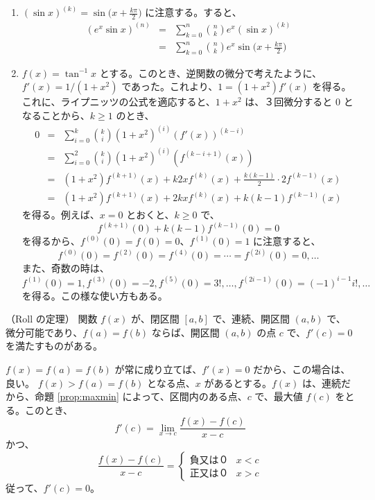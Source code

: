 \begin{eg}
\begin{enumerate}
\item ${\displaystyle (\sin x)^{(k)} = \sin\bigl(x+\frac{k\pi}{2}\bigr)}$ に注意する。すると、
\begin{eqnarray*}
(e^x\sin x)^{(n)} & =  & \sum_{k=0}^n {n\choose k}e^x(\sin x)^{(k)}\\
& = & \sum_{k=0}^n {n\choose k}e^x\sin\bigl(x+\frac{k\pi}{2}\bigr)
\end{eqnarray*}
\item $f(x) = \tan^{-1}x$ とする。このとき、逆関数の微分で考えたように、$f'(x) = 1/(1+x^2)$ であった。これより、$1 = (1+x^2)f'(x)$ を得る。これに、ライプニッツの公式を適応すると、$1+x^2$ は、３回微分すると $0$ となることから、$k\geq 1$ のとき、
\begin{eqnarray*}
0 & = & \sum_{i = 0}^k {k\choose i} (1+x^2)^{(i)}(f'(x))^{(k-i)}\\
   & = & \sum_{i = 0}^2 {k\choose i} (1+x^2)^{(i)}(f^{(k-i+1)}(x))\\
   & = & (1+x^2)f^{(k+1)}(x) + k2xf^{(k)}(x) + \frac{k(k-1)}2\cdot 2f^{(k-1)}(x)\\
   & = &  (1+x^2)f^{(k+1)}(x) + 2kxf^{(k)}(x) + {k(k-1)}f^{(k-1)}(x)
\end{eqnarray*}
を得る。例えば、$x = 0$ とおくと、$k\geq 0$ で、
$$f^{(k+1)}(0) + k(k-1)f^{(k-1)}(0) = 0$$
を得るから、$f^{(0)}(0) = f(0) = 0$、$f^{(1)}(0) = 1$ に注意すると、
$$f^{(0)}(0) = f^{(2)}(0) = f^{(4)}(0) = \cdots = f^{(2i)}(0) = 0, \ldots$$
また、奇数の時は、
$$f^{(1)}(0) = 1, f^{(3)}(0) = -2, f^{(5)}(0) = 3! , \ldots, f^{(2i-1)}(0) = (-1)^{i-1}i!, \ldots$$
を得る。この様な使い方もある。
\end{enumerate}
\end{eg}

\newpage
{}
\begin{prop}（Roll の定理）\quad \label{prop:roll}
関数 $f(x)$ が、閉区間 $[a,b]$ で、連続、開区間 $(a,b)$ で、微分可能であり、$f(a) = f(b)$ ならば、開区間 $(a,b)$ の点 $c$ で、$f'(c) = 0$ を満たすものがある。
\end{prop}
\proof
$f(x) = f(a) = f(b)$ が常に成り立てば、$f'(x) = 0$ だから、この場合は、良い。
$f(x) > f(a) = f(b)$ となる点、$x$ があるとする。$f(x)$ は、連続だから、命題 \ref{prop:maxmin} によって、区間内のある点、$c$ で、最大値 $f(c)$ をとる。このとき、
$$f'(c) = \lim_{x\rightarrow c}\frac{f(x) - f(c)}{x-c} $$
かつ、
$$\frac{f(x) - f(c)}{x-c} = \left\{\begin{array}{ll}\mbox{負又は０} & x< c \\
\mbox{正又は０} & x>c \end{array} \right.$$
従って、$f'(c) = 0$。

